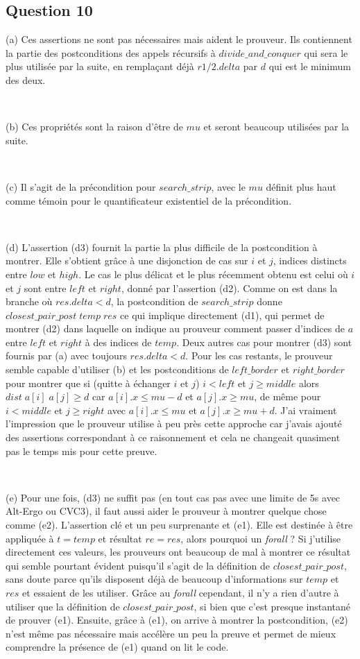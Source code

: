 \documentclass[11pt, openany, titlepage]{article}
\begin{document}
\subsection{Question 10}

(a) Ces assertions ne sont pas nécessaires mais aident le prouveur. Ils contiennent la partie des postconditions des appels récursifs à $divide\_and\_conquer$ qui sera le plus utilisée par la suite, en remplaçant déjà $r1/2.delta$ par $d$ qui est le minimum des deux.

\

(b) Ces propriétés sont la raison d'être de $mu$ et seront beaucoup utilisées par la suite.

\

(c) Il s'agit de la précondition pour $search\_strip$, avec le $mu$ définit plus haut comme témoin pour le quantificateur existentiel de la précondition.

\

(d) L'assertion (d3) fournit la partie la plus difficile de la postcondition à montrer. Elle s'obtient grâce à une disjonction de cas sur $i$ et $j$, indices distincts entre $low$ et $high$. Le cas le plus délicat et le plus récemment obtenu est celui où $i$ et $j$ sont entre $left$ et $right$, donné par l'assertion (d2). Comme on est dans la branche où $res.delta<d$, la postcondition de $search\_strip$ donne $closest\_pair\_post \;temp \;res$ ce qui implique directement (d1), qui permet de montrer (d2) dans laquelle on indique au prouveur comment passer d'indices de $a$ entre $left$ et $right$ à des indices de $temp$. Deux autres cas pour montrer (d3) sont fournis par (a) avec toujours $res.delta<d$. Pour les cas restants, le prouveur semble capable d'utiliser (b) et les postconditions de $left\_border$ et $right\_border$ pour montrer que si (quitte à échanger $i$ et $j$) $i<left$ et $j\geq middle$ alors  $dist\;a[i]\;a[j]\geq d$ car $a[i].x\leq mu-d$ et $a[j].x\geq mu$, de même pour $i<middle$ et $j\geq right$ avec $a[i].x\leq mu$ et $a[j].x\geq mu+d$. J'ai vraiment l'impression que le prouveur utilise à peu près cette approche car j'avais ajouté des assertions correspondant à ce raisonnement et cela ne changeait quasiment pas le temps mis pour cette preuve.

\

(e) Pour une fois, (d3) ne suffit pas (en tout cas pas avec une limite de 5s avec Alt-Ergo ou CVC3), il faut aussi aider le prouveur à montrer quelque chose comme (e2). L'assertion clé et un peu surprenante et (e1). Elle est destinée à être appliquée à $t=temp$ et résultat $re=res$, alors pourquoi un \emph{forall} ? Si j'utilise directement ces valeurs, les prouveurs ont beaucoup de mal à montrer ce résultat qui semble pourtant évident puisqu'il s'agit de la définition de $closest\_pair\_post$, sans doute parce qu'ils disposent déjà de beaucoup d'informations sur $temp$ et $res$ et essaient de les utiliser. Grâce au \emph{forall} cependant, il n'y a rien d'autre à utiliser que la définition de $closest\_pair\_post$, si bien que c'est presque instantané de prouver (e1). Ensuite, grâce à (e1), on arrive à montrer la postcondition, (e2) n'est même pas nécessaire mais accélère un peu la preuve et permet de mieux comprendre la présence de (e1) quand on lit le code.
\end{document}
